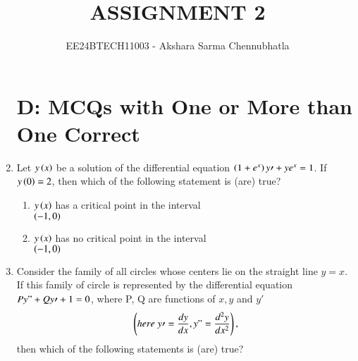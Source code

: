 \documentclass[journal,12pt,twocolumn,article]{IEEEtran}
\theoremstyle{remark}
\begin{document}
\begin{enumerate}[start = 6]

\vspace{3cm}
\title{ASSIGNMENT 2}
\author{EE24BTECH11003 - Akshara Sarma Chennubhatla}
\maketitle
\newpage
\bigskip
\section*{D: MCQs with One or More than One Correct}
\item Let $y\left(x\right)$ be a solution of the differential equation $\left(1+e^x\right)y\prime + ye^x = 1$. If $y\left(0\right) = 2$, then which of the following statement is (are) true?
\hfill{}
\begin{enumerate}
\item $y\left(x\right)$ has a critical point in the interval \\ $\left(-1,0\right)$
\item $y\left(x\right)$ has no critical point in the interval \\ $\left(-1,0\right)$
\end{enumerate}
\item Consider the family of all circles whose centers lie on the straight line $y = x$. If this family of circle is represented by the differential equation $Py" + Qy\prime + 1 = 0$, where P, Q are functions of $x,y$ and $y\prime$
\begin{align*}
\left(here\;y\prime = \frac{dy}{dx}, y" = \frac{d^2y}{dx^2}\right),
\end{align*} then which of the following statements is (are) true?
\hfill{}
\begin{enumerate}
\end{enumerate}
\end{enumerate}
\end{document}
